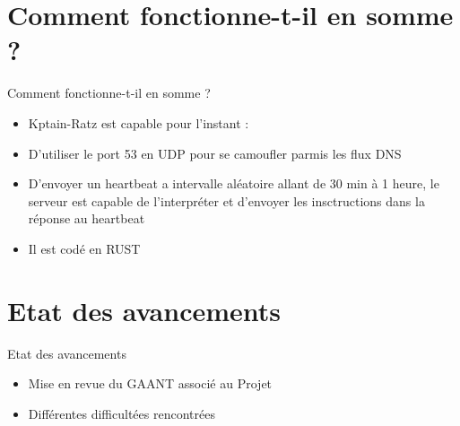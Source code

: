 \documentclass{beamer}
\begin{document}
\section{Comment fonctionne-t-il en somme ?}
  \begin{frame}{Comment fonctionne-t-il en somme ?}
  \begin{itemize}
	\item Kptain-Ratz est capable pour l'instant :
	\item D'utiliser le port 53 en UDP pour se camoufler parmis les flux DNS
	\item D'envoyer un heartbeat a intervalle aléatoire allant de 30 min à 1 heure, le serveur est capable de l'interpréter et d'envoyer les insctructions dans la réponse au heartbeat
	\item Il est codé en RUST
  \end{itemize}
  \end{frame}


\section{Etat des avancements}
  \begin{frame}{Etat des avancements}
  \begin{itemize}
	\item Mise en revue du GAANT associé au Projet 
	\item Différentes difficultées rencontrées
  \end{itemize}
  \end{frame}
\end{document}
